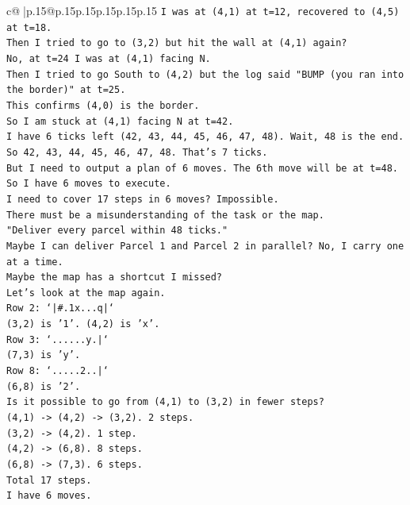 \documentclass{article}
\begin{document}
{\begin{supertabular}{c@{$\;$}|p{.15\linewidth}@{}p{.15\linewidth}p{.15\linewidth}p{.15\linewidth}p{.15\linewidth}p{.15\linewidth}}
{{{\texttt{I was at (4,1) at t=12, recovered to (4,5) at t=18.} \\
\texttt{Then I tried to go to (3,2) but hit the wall at (4,1) again?} \\
\texttt{No, at t=24 I was at (4,1) facing N.} \\
\texttt{Then I tried to go South to (4,2) but the log said "BUMP (you ran into the border)" at t=25.} \\
\texttt{This confirms (4,0) is the border.} \\
\texttt{So I am stuck at (4,1) facing N at t=42.} \\
\texttt{I have 6 ticks left (42, 43, 44, 45, 46, 47, 48). Wait, 48 is the end. So 42, 43, 44, 45, 46, 47, 48. That's 7 ticks.} \\
\texttt{But I need to output a plan of 6 moves. The 6th move will be at t=48.} \\
\texttt{So I have 6 moves to execute.} \\
\texttt{I need to cover 17 steps in 6 moves? Impossible.} \\
\texttt{There must be a misunderstanding of the task or the map.} \\
\texttt{"Deliver every parcel within 48 ticks."} \\
\texttt{Maybe I can deliver Parcel 1 and Parcel 2 in parallel? No, I carry one at a time.} \\
\texttt{Maybe the map has a shortcut I missed?} \\
\texttt{Let's look at the map again.} \\
\texttt{Row 2: `|\#.1x...q|`} \\
\texttt{(3,2) is '1'. (4,2) is 'x'.} \\
\texttt{Row 3: `......y.|`} \\
\texttt{(7,3) is 'y'.} \\
\texttt{Row 8: `.....2..|`} \\
\texttt{(6,8) is '2'.} \\
\texttt{Is it possible to go from (4,1) to (3,2) in fewer steps?} \\
\texttt{(4,1) {-}> (4,2) {-}> (3,2). 2 steps.} \\
\texttt{(3,2) {-}> (4,2). 1 step.} \\
\texttt{(4,2) {-}> (6,8). 8 steps.} \\
\texttt{(6,8) {-}> (7,3). 6 steps.} \\
\texttt{Total 17 steps.} \\
\texttt{I have 6 moves.} \\
}}}
\end{supertabular}}
\end{document}
